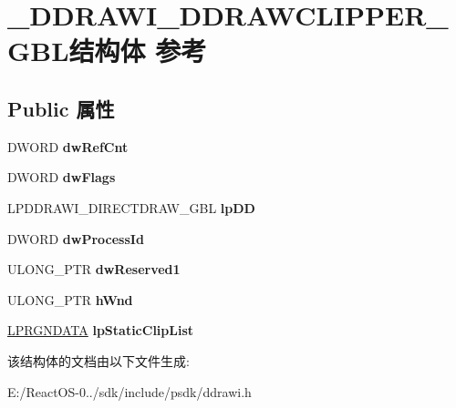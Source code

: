 \hypertarget{struct___d_d_r_a_w_i___d_d_r_a_w_c_l_i_p_p_e_r___g_b_l}{}\section{\+\_\+\+D\+D\+R\+A\+W\+I\+\_\+\+D\+D\+R\+A\+W\+C\+L\+I\+P\+P\+E\+R\+\_\+\+G\+B\+L结构体 参考}
\label{struct___d_d_r_a_w_i___d_d_r_a_w_c_l_i_p_p_e_r___g_b_l}
\subsection*{Public 属性}
\begin{DoxyCompactItemize}
\item 
\mbox{\label{struct___d_d_r_a_w_i___d_d_r_a_w_c_l_i_p_p_e_r___g_b_l_a6bc34717382ec5ac0f7d24dbab17fd67}} 
D\+W\+O\+RD {\bfseries dw\+Ref\+Cnt}
\item 
\mbox{\label{struct___d_d_r_a_w_i___d_d_r_a_w_c_l_i_p_p_e_r___g_b_l_a089171749a14e7e5b0c0ac6f2c2f20cf}} 
D\+W\+O\+RD {\bfseries dw\+Flags}
\item 
\mbox{\label{struct___d_d_r_a_w_i___d_d_r_a_w_c_l_i_p_p_e_r___g_b_l_aacf021b9c4589cc56fc7ed99e0f50edd}} 
L\+P\+D\+D\+R\+A\+W\+I\+\_\+\+D\+I\+R\+E\+C\+T\+D\+R\+A\+W\+\_\+\+G\+BL {\bfseries lp\+DD}
\item 
\mbox{\label{struct___d_d_r_a_w_i___d_d_r_a_w_c_l_i_p_p_e_r___g_b_l_a33c014384ed95354256ff7b000830925}} 
D\+W\+O\+RD {\bfseries dw\+Process\+Id}
\item 
\mbox{\label{struct___d_d_r_a_w_i___d_d_r_a_w_c_l_i_p_p_e_r___g_b_l_a398bc84e1efbae5ef1bd6314508dd5cd}} 
U\+L\+O\+N\+G\+\_\+\+P\+TR {\bfseries dw\+Reserved1}
\item 
\mbox{\label{struct___d_d_r_a_w_i___d_d_r_a_w_c_l_i_p_p_e_r___g_b_l_a6b0f720f95883c61024732b40c5eb849}} 
U\+L\+O\+N\+G\+\_\+\+P\+TR {\bfseries h\+Wnd}
\item 
\mbox{\label{struct___d_d_r_a_w_i___d_d_r_a_w_c_l_i_p_p_e_r___g_b_l_af198c4d51cc52bf5178bad8031df7fe3}} 
\hyperlink{struct___r_g_n_d_a_t_a}{L\+P\+R\+G\+N\+D\+A\+TA} {\bfseries lp\+Static\+Clip\+List}
\end{DoxyCompactItemize}


该结构体的文档由以下文件生成\+:\begin{DoxyCompactItemize}
\item 
E\+:/\+React\+O\+S-\/0../sdk/include/psdk/ddrawi.\+h\end{DoxyCompactItemize}
